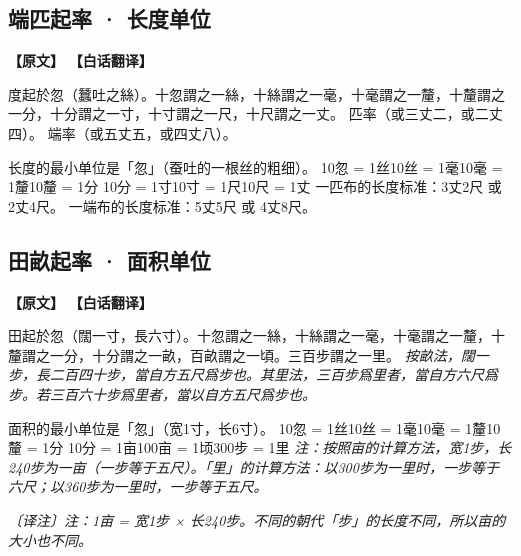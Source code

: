 \documentclass[11pt,a4paper]{article}
\newcommand{\noteMOD}[1]{\par\textcolor{notecolor}{\small\textit{〔译注〕#1}}\par\smallskip}
\begin{document}
\subsection{端匹起率 · 长度单位}

\begin{paracol}{2}
\noindent\textbf{\textcolor{leftlabel}{【原文】}}
\switchcolumn
\noindent\textbf{\textcolor{rightlabel}{【白话翻译】}}
\switchcolumn*

度起於忽（蠶吐之絲）。十忽謂之一絲，十絲謂之一毫，十毫謂之一釐，十釐謂之一分，十分謂之一寸，十寸謂之一尺，十尺謂之一丈。\break
匹率（或三丈二，或二丈四）。\break
端率（或五丈五，或四丈八）。

\switchcolumn

长度的最小单位是「忽」（蚕吐的一根丝的粗细）。\break
10忽 = 1丝\quad 10丝 = 1毫\quad 10毫 = 1釐\quad 10釐 = 1分\quad
10分 = 1寸\quad 10寸 = 1尺\quad 10尺 = 1丈\break
一匹布的长度标准：3丈2尺 或 2丈4尺。\break
一端布的长度标准：5丈5尺 或 4丈8尺。

\end{paracol}

\medskip

\subsection{田畝起率 · 面积单位}

\begin{paracol}{2}
\noindent\textbf{\textcolor{leftlabel}{【原文】}}
\switchcolumn
\noindent\textbf{\textcolor{rightlabel}{【白话翻译】}}
\switchcolumn*

田起於忽（闊一寸，長六寸）。十忽謂之一絲，十絲謂之一毫，十毫謂之一釐，十釐謂之一分，十分謂之一畝，百畝謂之一頃。三百步謂之一里。\break
\textit{按畝法，闊一步，長二百四十步，當自方五尺爲步也。其里法，三百步爲里者，當自方六尺爲步。若三百六十步爲里者，當以自方五尺爲步也。}

\switchcolumn

面积的最小单位是「忽」（宽1寸，长6寸）。\break
10忽 = 1丝\quad 10丝 = 1毫\quad 10毫 = 1釐\quad 10釐 = 1分\quad
10分 = 1亩\quad 100亩 = 1顷\quad 300步 = 1里\break
\textit{注：按照亩的计算方法，宽1步，长240步为一亩（一步等于五尺）。「里」的计算方法：以300步为一里时，一步等于六尺；以360步为一里时，一步等于五尺。}

\noteMOD{注：1亩 = 宽1步 × 长240步。不同的朝代「步」的长度不同，所以亩的大小也不同。}

\end{paracol}
\end{document}
